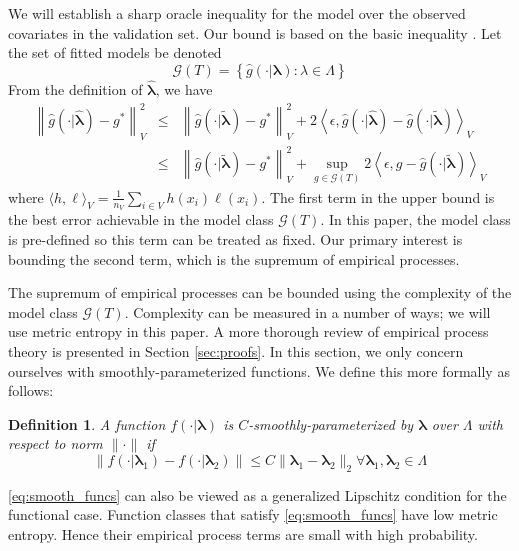 \documentclass[12pt]{article}
\newtheorem{definition}{Definition}
\begin{document}
We will establish a sharp oracle inequality for the model over the observed covariates in the validation set. Our bound is based on the basic inequality \citep{van2000empirical}.  Let the set of fitted models be denoted
\begin{equation}
\label{function_class_GT}
\mathcal{G}(T) = \left \{ \hat{g}(\cdot | \boldsymbol \lambda) : \lambda \in \Lambda  \right \}
\end{equation}
From the definition of $\hat{\boldsymbol \lambda}$, we have
\begin{eqnarray}
\label{basic_ineq}
\left \|\hat{g}(\cdot | \hat{\boldsymbol \lambda}) - g^* \right \|_V^2
& \le &
\left \| \hat{g}(\cdot | \tilde{\boldsymbol \lambda}) - g^* \right \|_V^2 +
2 \left \langle \epsilon, \hat{g}(\cdot | \hat{\boldsymbol \lambda}) - \hat{g}(\cdot | \tilde{\boldsymbol \lambda}) \right \rangle_V \\
& \le &
\left \| \hat{g}(\cdot | \tilde{\boldsymbol \lambda}) - g^* \right \|_V^2 +
\sup_{g \in \mathcal{G}(T)} 2 \left \langle \epsilon, g - \hat{g}(\cdot | \tilde{\boldsymbol \lambda}) \right \rangle_V
\label{eq:basic_ineq_emp_process}
\end{eqnarray}
where $\langle h, \ell \rangle_V = \frac{1}{n_V}\sum_{i\in V} h(x_i) \ell(x_i)$. The first term in the upper bound is the best error achievable in the model class $\mathcal{G}(T)$. In this paper, the model class is pre-defined so this term can be treated as fixed. Our primary interest is bounding the second term, which is the supremum of empirical processes.

The supremum of empirical processes can be bounded using the complexity of the model class $\mathcal{G}(T)$. Complexity can be measured in a number of ways; we will use metric entropy in this paper. A more thorough review of empirical process theory is presented in Section \ref{sec:proofs}. In this section, we only concern ourselves with smoothly-parameterized functions. We define this more formally as follows:

\begin{definition}
\label{def:smooth_funcs}
A function $f(\cdot | \boldsymbol{\lambda})$ is $C$-smoothly-parameterized by $\boldsymbol \lambda$ over $\Lambda$ with respect to norm $\| \cdot \|$ if
\begin{equation}
\left \| f(\cdot | \boldsymbol \lambda_1) - f(\cdot | \boldsymbol \lambda_2) \right \|
\le
C \| \boldsymbol \lambda_1 - \boldsymbol \lambda_2 \|_2 
\forall \boldsymbol \lambda_1,\boldsymbol \lambda_2 \in \Lambda
\label{eq:smooth_funcs}
\end{equation}
\end{definition}
\eqref{eq:smooth_funcs} can also be viewed as a generalized Lipschitz condition for the functional case. Function classes that satisfy \eqref{eq:smooth_funcs} have low metric entropy. Hence their empirical process terms are small with high probability.
\end{document}
